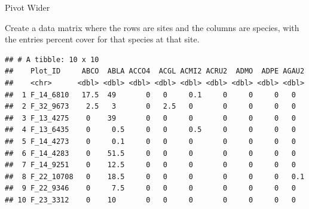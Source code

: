 \documentclass[
  ignorenonframetext,
]{beamer}
\newenvironment{Shaded}{\begin{snugshade}}{\end{snugshade}}
\newcommand{\CommentTok}[1]{\textcolor[rgb]{0.56,0.35,0.01}{\textit{#1}}}
\newcommand{\DataTypeTok}[1]{\textcolor[rgb]{0.13,0.29,0.53}{#1}}
\newcommand{\DecValTok}[1]{\textcolor[rgb]{0.00,0.00,0.81}{#1}}
\newcommand{\KeywordTok}[1]{\textcolor[rgb]{0.13,0.29,0.53}{\textbf{#1}}}
\newcommand{\NormalTok}[1]{#1}
\newcommand{\OperatorTok}[1]{\textcolor[rgb]{0.81,0.36,0.00}{\textbf{#1}}}
\newcommand{\StringTok}[1]{\textcolor[rgb]{0.31,0.60,0.02}{#1}}
\begin{document}
\begin{frame}[fragile]{Pivot Wider}
\protect\hypertarget{pivot-wider}{}

Create a data matrix where the rows are sites and the columns are
species, with the entries percent cover for that species at that site.

\scriptsize

\begin{Shaded}
\end{Shaded}

\begin{verbatim}
## # A tibble: 10 x 10
##    Plot_ID     ABCO  ABLA ACCO4  ACGL ACMI2 ACRU2  ADMO  ADPE AGAU2
##    <chr>      <dbl> <dbl> <dbl> <dbl> <dbl> <dbl> <dbl> <dbl> <dbl>
##  1 F_14_6810   17.5  49       0   0     0.1     0     0     0   0  
##  2 F_32_9673    2.5   3       0   2.5   0       0     0     0   0  
##  3 F_13_4275    0    39       0   0     0       0     0     0   0  
##  4 F_13_6435    0     0.5     0   0     0.5     0     0     0   0  
##  5 F_14_4273    0     0.1     0   0     0       0     0     0   0  
##  6 F_14_4283    0    51.5     0   0     0       0     0     0   0  
##  7 F_14_9251    0    12.5     0   0     0       0     0     0   0  
##  8 F_22_10708   0    18.5     0   0     0       0     0     0   0.1
##  9 F_22_9346    0     7.5     0   0     0       0     0     0   0  
## 10 F_23_3312    0    10       0   0     0       0     0     0   0
\end{verbatim}

\end{frame}
\end{document}
